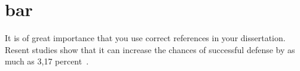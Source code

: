 

\section{bar}

\blindtext
It is of great importance that you use correct references in your dissertation.
Resent studies show that it can increase the chances of successful defense
by as much as 3,17 percent~\cite{big,small,russian}.

\Blindtext
